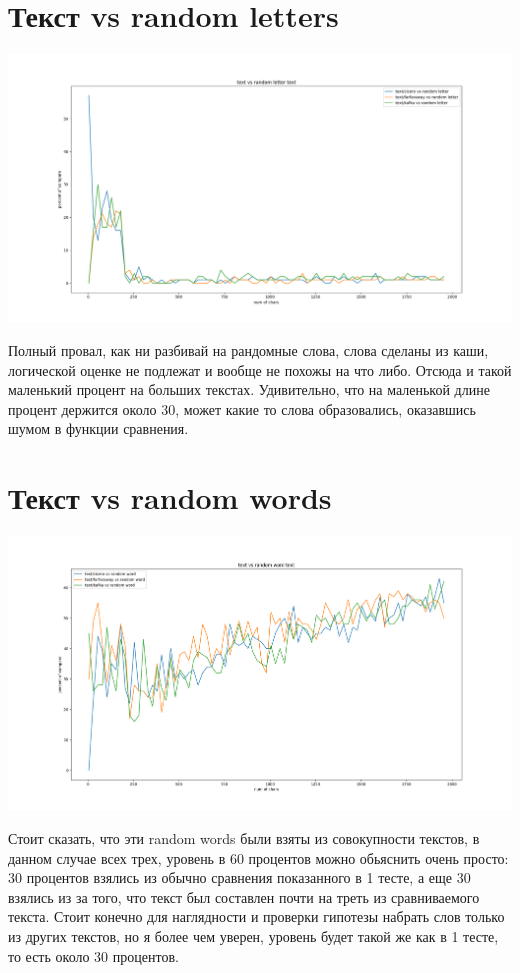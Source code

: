 \section{Текст vs random letters}
\includegraphics[scale=0.4]{pic/2.png}

Полный провал, как ни разбивай на рандомные слова, слова сделаны из каши, логической оценке не подлежат и вообще не похожы на что либо. Отсюда и такой маленький процент на больших текстах. Удивительно, что на маленькой длине процент держится около 30, может какие то слова образовались, оказавшись шумом в функции сравнения.

\section{Текст vs random words}
\includegraphics[scale=0.4]{pic/3.png}

Стоит сказать, что эти random words были взяты из совокупности текстов, в данном случае всех трех, уровень в 60 процентов можно обьяснить очень просто: 30 процентов взялись из обычно сравнения показанного в 1 тесте, а еще 30 взялись из за того, что текст был составлен почти на треть из сравниваемого текста. Стоит конечно для наглядности и проверки гипотезы набрать слов только из других текстов, но я более чем уверен, уровень будет такой же как в 1 тесте, то есть около 30 процентов.


